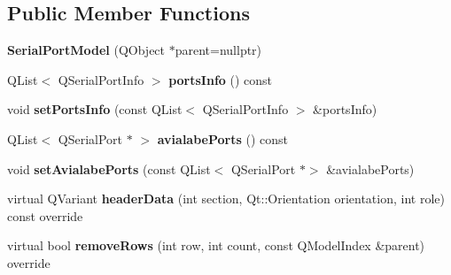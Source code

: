 \subsection*{Public Member Functions}
\begin{DoxyCompactItemize}
\item 
\mbox{\label{class_utilities_1_1_serial_port_model_ab74ab55a8ca5a6255240701466ba534a}} 
{\bfseries Serial\+Port\+Model} (Q\+Object $\ast$parent=nullptr)
\item 
\mbox{\label{class_utilities_1_1_serial_port_model_aca796b65decbcbea757db4478e015559}} 
Q\+List$<$ Q\+Serial\+Port\+Info $>$ {\bfseries ports\+Info} () const
\item 
\mbox{\label{class_utilities_1_1_serial_port_model_a9357641fbf3a53f7ab97a3624656d0e7}} 
void {\bfseries set\+Ports\+Info} (const Q\+List$<$ Q\+Serial\+Port\+Info $>$ \&ports\+Info)
\item 
\mbox{\label{class_utilities_1_1_serial_port_model_ae17bdaa1d13f60f60da0d4218cae0fbb}} 
Q\+List$<$ Q\+Serial\+Port $\ast$ $>$ {\bfseries avialabe\+Ports} () const
\item 
\mbox{\label{class_utilities_1_1_serial_port_model_ac8678f219e4a380a8de05f556e48f47c}} 
void {\bfseries set\+Avialabe\+Ports} (const Q\+List$<$ Q\+Serial\+Port $\ast$$>$ \&avialabe\+Ports)
\item 
\mbox{\label{class_utilities_1_1_serial_port_model_adebd2b1a062707e998b85e97f30ede95}} 
virtual Q\+Variant {\bfseries header\+Data} (int section, Qt\+::\+Orientation orientation, int role) const override
\item 
\mbox{\label{class_utilities_1_1_serial_port_model_aa12f773f0b7f7e1bbd5e1110f559f366}} 
virtual bool {\bfseries remove\+Rows} (int row, int count, const Q\+Model\+Index \&parent) override
\item 
\mbox{\label{class_utilities_1_1_serial_port_model_ad61015517918391e750673b2d0a2743f}} 
$$
\end{DoxyCompactItemize}
